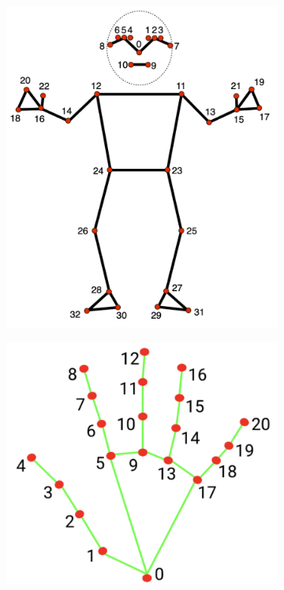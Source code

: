 \documentclass[acmsmall, screen]{acmart}
\begin{document}
\begin{figure}[tbp]
  \centering
  \begin{subfigure}[b]{0.35\linewidth}
    \centering
    \includegraphics[width=\linewidth]{assets/pose-landmarks.png}
  \end{subfigure}%
  \hspace{1em}%
  \begin{subfigure}[b]{0.35\linewidth}
    \centering
    \includegraphics[width=\linewidth]{assets/hand-landmarks.png}

\end{subfigure}
\end{figure}
\end{document}
